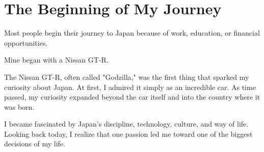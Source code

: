 \section{The Beginning of My Journey}

Most people begin their journey to Japan because of work, education, or financial opportunities.

Mine began with a Nissan GT-R.

The Nissan GT-R, often called "Godzilla," was the first thing that sparked my curiosity about Japan. At first, I admired it simply as an incredible car. As time passed, my curiosity expanded beyond the car itself and into the country where it was born.

I became fascinated by Japan's discipline, technology, culture, and way of life. Looking back today, I realize that one passion led me toward one of the biggest decisions of my life.